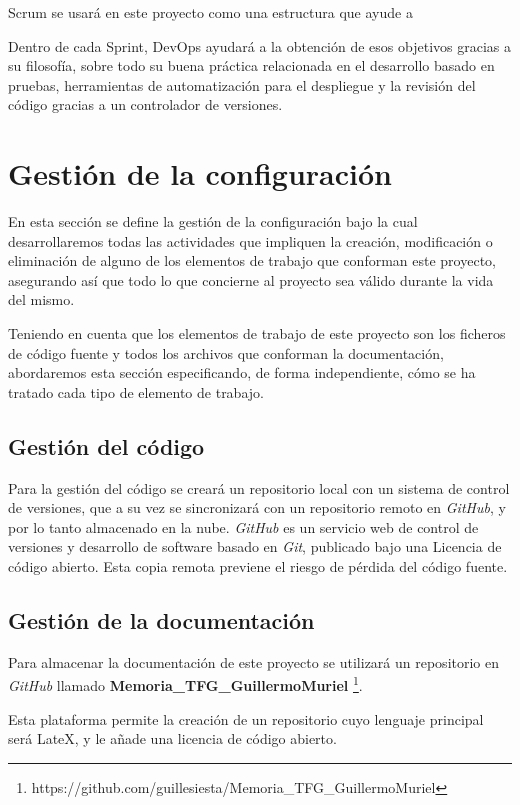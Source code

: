 Scrum se usará en este proyecto como una estructura que ayude a 

Dentro de cada Sprint, DevOps ayudará a la obtención de esos objetivos gracias a su filosofía, sobre todo su buena práctica relacionada en el desarrollo basado en pruebas, herramientas de automatización para el despliegue y la revisión del código gracias a un controlador de versiones.

\section{Gestión de la configuración}
En esta sección se define la gestión de la configuración bajo la cual desarrollaremos todas las actividades que impliquen la creación, modificación o eliminación de alguno de los elementos de trabajo que conforman este proyecto, asegurando así que todo lo que concierne al proyecto sea válido durante la vida del mismo.

 Teniendo en cuenta que los elementos de trabajo de este proyecto son los ficheros de código fuente y todos los archivos que conforman la documentación, abordaremos esta sección especificando, de forma independiente, cómo se ha tratado cada tipo de elemento de trabajo.
 
\subsection{Gestión del código}

Para la gestión del código se creará un repositorio local con un  sistema de control de versiones, que a su vez se sincronizará con un repositorio remoto en \textit{GitHub}, y por lo tanto almacenado en la nube. \textit{GitHub} es un servicio web de control de versiones y desarrollo de software basado en \textit{Git}, publicado bajo una Licencia de código abierto. Esta copia remota previene el riesgo de pérdida del código fuente.

\subsection{Gestión de la documentación}
Para almacenar la documentación de este proyecto se utilizará un repositorio en \textit{GitHub} llamado \textbf{Memoria\_TFG\_GuillermoMuriel} \footnote{https://github.com/guillesiesta/Memoria\_TFG\_GuillermoMuriel}.

Esta plataforma permite la creación de un repositorio cuyo lenguaje principal será LateX, y le añade una licencia de código abierto.

